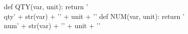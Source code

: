 \begin{pycode}
def QTY(var, unit):
        return '\\qty{' + str(var) + '}{' + unit + '}'
def NUM(var, unit):
    return '\\num{' + str(var) + '}{' + unit + '}'
\end{pycode}